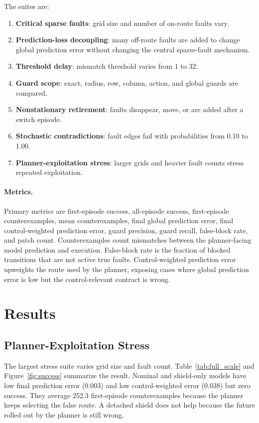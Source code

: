 \documentclass{article}
\begin{document}
The suites are:
\begin{enumerate}
    \item \textbf{Critical sparse faults}: grid size and number of on-route faults vary.
    \item \textbf{Prediction-loss decoupling}: many off-route faults are added to change global prediction error without changing the central sparse-fault mechanism.
    \item \textbf{Threshold delay}: mismatch threshold varies from 1 to 32.
    \item \textbf{Guard scope}: exact, radius, row, column, action, and global guards are compared.
    \item \textbf{Nonstationary retirement}: faults disappear, move, or are added after a switch episode.
    \item \textbf{Stochastic contradictions}: fault edges fail with probabilities from 0.10 to 1.00.
    \item \textbf{Planner-exploitation stress}: larger grids and heavier fault counts stress repeated exploitation.
\end{enumerate}

\paragraph{Metrics.}
Primary metrics are first-episode success, all-episode success, first-episode counterexamples, mean counterexamples, final global prediction error, final control-weighted prediction error, guard precision, guard recall, false-block rate, and patch count. Counterexamples count mismatches between the planner-facing model prediction and execution. False-block rate is the fraction of blocked transitions that are not active true faults. Control-weighted prediction error upweights the route used by the planner, exposing cases where global prediction error is low but the control-relevant contract is wrong.

\section{Results}

\subsection{Planner-Exploitation Stress}

The largest stress suite varies grid size and fault count. Table~\ref{tab:full_scale} and Figure~\ref{fig:success} summarize the result. Nominal and shield-only models have low final prediction error (0.003) and low control-weighted error (0.038) but zero success. They average 252.3 first-episode counterexamples because the planner keeps selecting the false route. A detached shield does not help because the future rolled out by the planner is still wrong.
\end{document}
